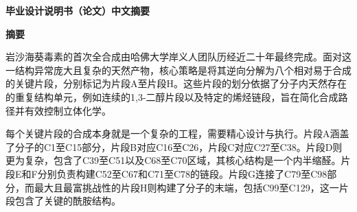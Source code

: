 \thispagestyle{empty} %
\begin{center}
    \vspace*{-1.4cm} %
    {\songti \textbf{毕\hspace{0.3em}业\hspace{0.3em}设\hspace{0.3em}计\hspace{0.3em}说\hspace{0.3em}明\hspace{0.3em}书\hspace{0.3em}（论文）\hspace{0.3em}中\hspace{0.3em}文\hspace{0.3em}摘\hspace{0.3em}要}}\\
\end{center}


\setlength{\parindent}{2em}   %
\setlength{\parskip}{0pt plus 1.0pt}    %
\songti             %


\vspace*{-30pt}
\begin{center}
    \heiti \textbf{摘\quad 要}
\end{center}
\vspace*{-10pt}


 岩沙海葵毒素的首次全合成由哈佛大学岸义人团队历经近二十年最终完成。面对这一结构异常庞大且复杂的天然产物，核心策略是将其逆向分解为八个相对易于合成的关键片段，分别标记为片段A至片段H。这些片段的划分依据了分子内天然存在的重复结构单元，例如连续的1,3-二醇片段以及特定的烯烃链段，旨在简化合成路径并有效控制立体化学。

 每个关键片段的合成本身就是一个复杂的工程，需要精心设计与执行。片段A涵盖了分子的C1至C15部分，片段B对应C16至C26，片段C对应C27至C38。片段D则更为复杂，包含了C39至C51以及C68至C70区域，其核心结构是一个内半缩醛。片段E和F分别负责构建C52至C67和C71至C78的链段。片段G连接了C79至C98部分，而最大且最富挑战性的片段H则构建了分子的末端，包括C99至C129，这一片段包含了关键的酰胺结构。

